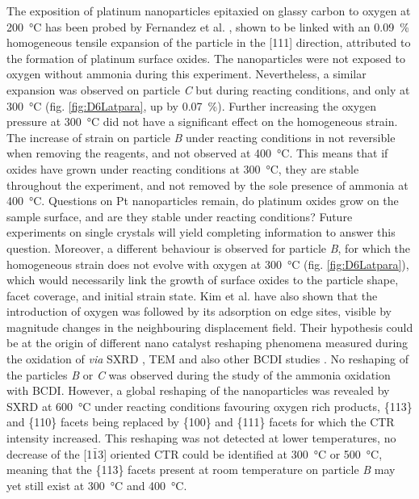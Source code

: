 The exposition of platinum nanoparticles epitaxied on glassy carbon to oxygen at \qty{200}{\degreeCelsius} has been probed by Fernandez et al. \parencite*{Fernandez2019}, shown to be linked with an \qty{0.09}{\percent} homogeneous tensile expansion of the particle in the [111] direction, attributed to the formation of platinum surface oxides.
The nanoparticles were not exposed to oxygen without ammonia during this experiment.
Nevertheless, a similar expansion was observed on particle \textit{C} but during reacting conditions, and only at \qty{300}{\degreeCelsius} (fig. \ref{fig:D6Latpara}, up by \qty{0.07}{\percent}).
Further increasing the oxygen pressure at \qty{300}{\degreeCelsius} did not have a significant effect on the homogeneous strain.
The increase of strain on particle \textit{B} under reacting conditions in not reversible when removing the reagents, and not observed at \qty{400}{\degreeCelsius}.
This means that if oxides have grown under reacting conditions at \qty{300}{\degreeCelsius}, they are stable throughout the experiment, and not removed by the sole presence of ammonia at \qty{400}{\degreeCelsius}.
Questions on Pt nanoparticles remain, do platinum oxides grow on the sample surface, and are they stable under reacting conditions?
Future experiments on single crystals will yield completing information to answer this question.
Moreover, a different behaviour is observed for particle \textit{B}, for which the homogeneous strain does not evolve with oxygen at \qty{300}{\degreeCelsius} (fig. \ref{fig:D6Latpara}), which would necessarily link the growth of surface oxides to the particle shape, facet coverage, and initial strain state.
Kim et al. \parencite*{Kim2018} have also shown that the introduction of oxygen was followed by its adsorption on edge sites, visible by magnitude changes in the neighbouring displacement field.
Their hypothesis could be at the origin of different nano catalyst reshaping phenomena measured during the oxidation of  \textit{via} SXRD \parencite{Nolte2008, Hejral2016}, TEM \parencite{Vendelbo2014} and also other BCDI studies \parencite{Abuin2019}.
No reshaping of the particles \textit{B} or \textit{C} was observed during the study of the ammonia oxidation with BCDI.
However, a global reshaping of the nanoparticles was revealed by SXRD at \qty{600}{\degreeCelsius} under reacting conditions favouring oxygen rich products, \{113\} and \{110\} facets being replaced by \{100\} and \{111\} facets for which the CTR intensity increased.
This reshaping was not detected at lower temperatures, no decrease of the [1$\bar{1}$3] oriented CTR could be identified at \qty{300}{\degreeCelsius} or \qty{500}{\degreeCelsius}, meaning that the \{113\} facets present at room temperature on particle \textit{B} may yet still exist at \qty{300}{\degreeCelsius} and \qty{400}{\degreeCelsius}.

